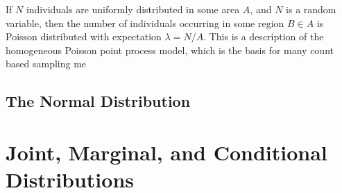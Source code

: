 If $N$ individuals are uniformly distributed in some area $A$, and $N$ is a
random variable, then the number of individuals occurring in some
region $B \in A$ is Poisson distributed with expectation $\lambda =
N/A$. This is a description of the homogeneous Poisson point process
model, which is the basis for many count based sampling me


\subsection{The Normal Distribution}













\section{Joint, Marginal, and Conditional Distributions}

